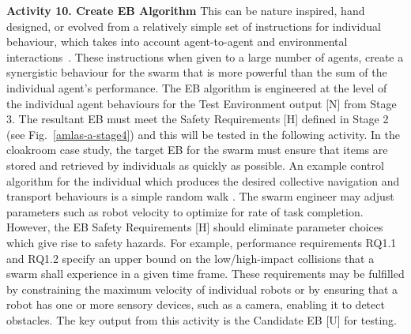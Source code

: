 \documentclass[runningheads]{llncs}
\begin{document}
\noindent\textbf{Activity 10. Create EB Algorithm} 
This can be nature inspired, hand designed, or evolved from a relatively simple set of instructions for individual behaviour, which takes into account agent-to-agent and environmental interactions~\cite{Jones2018}. These instructions when given to a large number of agents, create a synergistic behaviour for the swarm that is more powerful than the sum of the individual agent's performance. 
The EB algorithm is engineered at the level of the individual agent behaviours for the Test Environment output [N] from Stage 3. The resultant EB must meet the Safety Requirements [H] defined in Stage 2 (see Fig.~\ref{amlas-a-stage4}) and this will be tested in the following activity. 
In the cloakroom case study, the target EB for the swarm must ensure that items are stored and retrieved by individuals as quickly as possible. An example control algorithm for the individual which produces the desired collective navigation and transport behaviours is a simple random walk \cite{milner2022stochastic}. The swarm engineer may adjust parameters such as robot velocity to optimize for rate of task completion. However, the EB Safety Requirements [H] should eliminate parameter choices which give rise to safety hazards. 
For example, performance requirements RQ1.1 and RQ1.2 specify an upper bound on the low/high-impact collisions that a swarm shall experience in a given time frame. 
These requirements may be fulfilled by constraining the maximum velocity of individual robots or by ensuring that a robot has one or more sensory devices, such as a camera, enabling it to detect obstacles. 
The key output from this activity is the Candidate EB [U] for testing.
\end{document}

